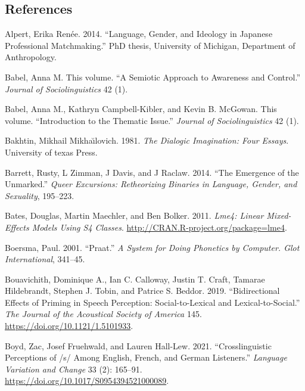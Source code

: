 \documentclass[
  letterpaper,
  DIV=11,
  numbers=noendperiod]{scrartcl}
\newlength{\cslhangindent}
\newenvironment{CSLReferences}[2] %
 {\begin{list}{}{%
  \setlength{\itemindent}{0pt}
  \setlength{\leftmargin}{0pt}
  \setlength{\parsep}{0pt}
  \ifodd #1
   \setlength{\leftmargin}{\cslhangindent}
   \setlength{\itemindent}{-1\cslhangindent}
  \fi
  \setlength{\itemsep}{#2\baselineskip}}}
 {\end{list}}
\begin{document}
\subsection*{References}\label{references}

\label{refs}
\begin{CSLReferences}{1}{0}
Alpert, Erika Renée. 2014. {``Language, Gender, and Ideology in Japanese
Professional Matchmaking.''} PhD thesis, University of Michigan,
Department of Anthropology.

Babel, Anna M. This volume. {``A Semiotic Approach to Awareness and
Control.''} \emph{Journal of Sociolinguistics} 42 (1).

Babel, Anna M., Kathryn Campbell-Kibler, and Kevin B. McGowan. This
volume. {``Introduction to the Thematic Issue.''} \emph{Journal of
Sociolinguistics} 42 (1).

Bakhtin, Mikhail Mikhaı̆lovich. 1981. \emph{The Dialogic Imagination:
Four Essays}. University of texas Press.

Barrett, Rusty, L Zimman, J Davis, and J Raclaw. 2014. {``The Emergence
of the Unmarked.''} \emph{Queer Excursions: Retheorizing Binaries in
Language, Gender, and Sexuality}, 195--223.

Bates, Douglas, Martin Maechler, and Ben Bolker. 2011. \emph{Lme4:
Linear Mixed-Effects Models Using S4 Classes}.
\url{http://CRAN.R-project.org/package=lme4}.

Boersma, Paul. 2001. {``Praat.''} \emph{A System for Doing Phonetics by
Computer. {Glot} {International}}, 341--45.

Bouavichith, Dominique A., Ian C. Calloway, Justin T. Craft, Tamarae
Hildebrandt, Stephen J. Tobin, and Patrice S. Beddor. 2019.
{``Bidirectional Effects of Priming in Speech Perception:
Social-to-Lexical and Lexical-to-Social.''} \emph{The Journal of the
Acoustical Society of America} 145.
\url{https://doi.org/10.1121/1.5101933}.

Boyd, Zac, Josef Fruehwald, and Lauren Hall-Lew. 2021.
{``Crosslinguistic Perceptions of /s/ Among English, French, and German
Listeners.''} \emph{Language Variation and Change} 33 (2): 165--91.
\url{https://doi.org/10.1017/S0954394521000089}.


\end{CSLReferences}
\end{document}
